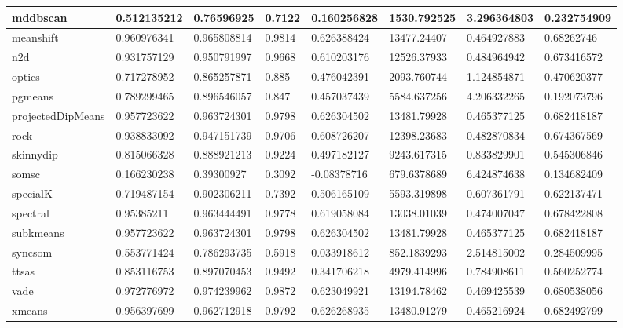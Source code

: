 \begin{table}[H]
\begin{tabular}{|l|l|l|l|l|l|l|l|}
\hline
mddbscan & 0.512135212 & 0.76596925 & 0.7122 & 0.160256828 & 1530.792525 & 3.296364803 & 0.232754909 \\
\hline
meanshift & 0.960976341 & 0.965808814 & 0.9814 & 0.626388424 & 13477.24407 & 0.464927883 & 0.68262746 \\
\hline
n2d & 0.931757129 & 0.950791997 & 0.9668 & 0.610203176 & 12526.37933 & 0.484964942 & 0.673416572 \\
\hline
optics & 0.717278952 & 0.865257871 & 0.885 & 0.476042391 & 2093.760744 & 1.124854871 & 0.470620377 \\
\hline
pgmeans & 0.789299465 & 0.896546057 & 0.847 & 0.457037439 & 5584.637256 & 4.206332265 & 0.192073796 \\
\hline
projectedDipMeans & 0.957723622 & 0.963724301 & 0.9798 & 0.626304502 & 13481.79928 & 0.465377125 & 0.682418187 \\
\hline
rock & 0.938833092 & 0.947151739 & 0.9706 & 0.608726207 & 12398.23683 & 0.482870834 & 0.674367569 \\
\hline
skinnydip & 0.815066328 & 0.888921213 & 0.9224 & 0.497182127 & 9243.617315 & 0.833829901 & 0.545306846 \\
\hline
somsc & 0.166230238 & 0.39300927 & 0.3092 & -0.08378716 & 679.6378689 & 6.424874638 & 0.134682409 \\
\hline
specialK & 0.719487154 & 0.902306211 & 0.7392 & 0.506165109 & 5593.319898 & 0.607361791 & 0.622137471 \\
\hline
spectral & 0.95385211 & 0.963444491 & 0.9778 & 0.619058084 & 13038.01039 & 0.474007047 & 0.678422808 \\
\hline
subkmeans & 0.957723622 & 0.963724301 & 0.9798 & 0.626304502 & 13481.79928 & 0.465377125 & 0.682418187 \\
\hline
syncsom & 0.553771424 & 0.786293735 & 0.5918 & 0.033918612 & 852.1839293 & 2.514815002 & 0.284509995 \\
\hline
ttsas & 0.853116753 & 0.897070453 & 0.9492 & 0.341706218 & 4979.414996 & 0.784908611 & 0.560252774 \\
\hline
vade & 0.972776972 & 0.974239962 & 0.9872 & 0.623049921 & 13194.78462 & 0.469425539 & 0.680538056 \\
\hline
xmeans & 0.956397699 & 0.962712918 & 0.9792 & 0.626268935 & 13480.91279 & 0.465216924 & 0.682492799 \\
\hline
\end{tabular}
\end{table}

\clearpage

